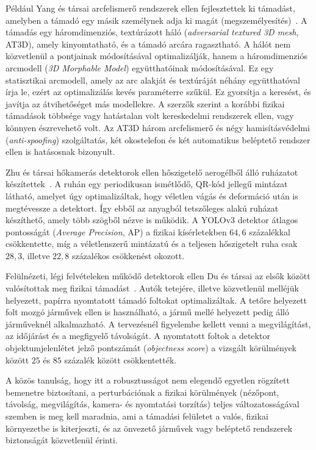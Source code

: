 Például Yang és társai arcfelismerő rendszerek ellen fejlesztettek ki támadást, amelyben a támadó egy másik személynek adja ki 
magát (megszemélyesítés)~\cite{yang2023at3d}. 
A támadás egy háromdimenziós, textúrázott háló (\textit{adversarial textured 3D mesh}, AT3D), amely kinyomtatható, és a támadó 
arcára ragasztható. 
A hálót nem közvetlenül a pontjainak módosításával optimalizálják, hanem a háromdimenziós arcmodell (\textit{3D Morphable Model}) 
együtthatóinak módosításával. 
Ez egy statisztikai arcmodell, amely az arc alakját és textúráját néhány együtthatóval írja le, ezért az optimalizálás kevés 
paraméterre szűkül. 
Ez gyorsítja a keresést, és javítja az átvihetőséget más modellekre. 
A szerzők szerint a korábbi fizikai támadások többsége vagy hatástalan volt kereskedelmi rendszerek ellen, vagy könnyen 
észrevehető volt. 
Az AT3D három arcfelismerő és négy hamisításvédelmi (\textit{anti-spoofing}) szolgáltatás, két okostelefon és két automatikus 
beléptető rendszer ellen is hatásosnak bizonyult. 

Zhu és társai hőkamerás detektorok ellen hőszigetelő aerogélből álló ruházatot készítettek~\cite{zhu2022infrared}. 
A ruhán egy periodikusan ismétlődő, QR-kód jellegű mintázat látható, amelyet úgy optimalizáltak, hogy véletlen vágás és 
deformáció után is megtévessze a detektort. 
Így ebből az anyagból tetszőleges alakú ruházat készíthető, amely több szögből nézve is működik. 
A YOLOv3 detektor átlagos pontosságát (\textit{Average Precision}, AP) a fizikai kísérletekben $64{,}6$ százalékkal csökkentette, 
míg a véletlenszerű mintázatú és a teljesen hőszigetelt ruha csak $28{,}3$, illetve $22{,}8$ százalékos csökkenést okozott. 

Felülnézeti, légi felvételeken működő detektorok ellen Du és társai az elsők között valósítottak meg fizikai támadást~\cite{du2022aerial}. 
Autók tetejére, illetve közvetlenül melléjük helyezett, papírra nyomtatott támadó foltokat optimalizáltak. 
A tetőre helyezett folt mozgó járművek ellen is használható, a jármű mellé helyezett pedig álló járműveknél alkalmazható. 
A tervezésnél figyelembe kellett venni a megvilágítást, az időjárást és a megfigyelő távolságát. 
A nyomtatott foltok a detektor objektumjelenlétet jelző pontszámát (\textit{objectness score}) a vizsgált körülmények között 
$25$ és $85$ százalék között csökkentették. 

A közös tanulság, hogy itt a robusztusságot nem elegendő egyetlen rögzített bemenetre biztosítani, a perturbációnak a fizikai 
körülmények (nézőpont, távolság, megvilágítás, kamera- és nyomtatási torzítás) teljes változatosságával szemben is meg kell 
maradnia, ami a támadási felületet a valós, fizikai környezetbe is kiterjeszti, és az önvezető járművek vagy beléptető 
rendszerek biztonságát közvetlenül érinti. 

